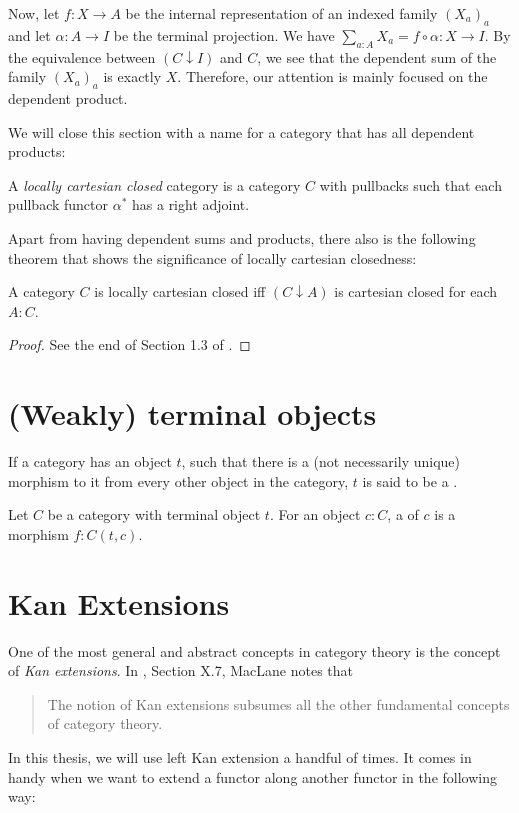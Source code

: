 Now, let $ f : X \to A $ be the internal representation of an indexed family $ (X_a)_a $ and let $ \alpha : A \to I $ be the terminal projection. We have $ \sum_{a : A} X_a = f \circ \alpha : X \to I $. By the equivalence between $ (C \downarrow I) $ and $ C $, we see that the dependent sum of the family $ (X_a)_a $ is exactly $ X $. Therefore, our attention is mainly focused on the dependent product.

We will close this section with a name for a category that has all dependent products:

\begin{definition}
  A \textit{locally cartesian closed} category is a category $ C $ with pullbacks such that each pullback functor $ \alpha^* $ has a right adjoint.
\end{definition}

Apart from having dependent sums and products, there also is the following theorem that shows the significance of locally cartesian closedness:
\begin{lemma}\label{lem:locally-cartesian-closed}
  A category $ C $ is locally cartesian closed iff $ (C \downarrow A) $ is cartesian closed for each $ A : C $.
\end{lemma}
\begin{proof}
  See the end of Section 1.3 of \cite{freyd}.
\end{proof}

\section{(Weakly) terminal objects}
\begin{definition}
  If a category has an object $ t $, such that there is a (not necessarily unique) morphism to it from every other object in the category, $ t $ is said to be a .
\end{definition}

\begin{definition}
  Let $ C $ be a category with terminal object $ t $. For an object $ c: C $, a  of $ c $ is a morphism $ f: C(t, c) $.
\end{definition}


\section{Kan Extensions}
One of the most general and abstract concepts in category theory is the concept of \textit{Kan extensions}. In \cite{MacLane}, Section X.7, MacLane notes that
\begin{quote}
  The notion of Kan extensions subsumes all the other fundamental concepts of category theory.
\end{quote}
In this thesis, we will use left Kan extension a handful of times. It comes in handy when we want to extend a functor along another functor in the following way:

